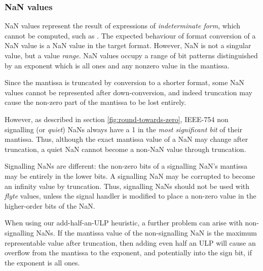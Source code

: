 \documentclass{sig-alternate-05-2015}
\begin{document}
\subsubsection{NaN values}

NaN values represent the result of expressions of \emph{indeterminate form},
which cannot be computed, such as . The expected behaviour of
format conversion of a NaN value is a NaN value in the target format. However,
NaN is not a singular value, but a value \emph{range}. NaN values occupy a
range of bit patterns distinguished by an exponent which is all ones and any
nonzero value in the mantissa.

Since the mantissa is truncated by conversion to a shorter format,
some NaN values cannot be represented after down-conversion, and
indeed truncation may cause the non-zero part of the mantissa to be
lost entirely.

However, as described in section \ref{fig:round-towards-zero}, IEEE-754 non
signalling (or \textit{quiet}) NaNs always have a 1 in the \emph{most
significant bit} of their mantissa. Thus, although the exact mantissa value of
a NaN may change after truncation, a quiet NaN cannot become a non-NaN value
through truncation.

Signalling NaNs are different: the non-zero bits of a signalling NaN's
mantissa may be entirely in the lower bits. A signalling NaN may be
corrupted to become an infinity value by truncation. Thus, signalling
NaNs should not be used with \textit{flyte} values, unless the signal
handler is modified to place a non-zero value in the higher-order bits
of the NaN.

When using our add-half-an-ULP heuristic, a further problem can arise with
non-signalling NaNs. If the mantissa value of the non-signalling NaN is the
maximum representable value after truncation, then adding even half an ULP will
cause an overflow from the mantissa to the exponent, and potentially into the
sign bit, if the exponent is all ones.
\end{document}
